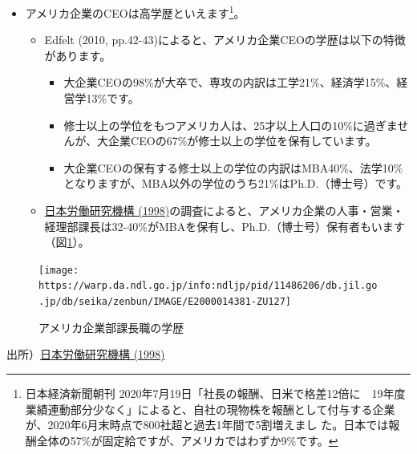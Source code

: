 \documentclass[
]{book}
\begin{document}
\begin{itemize}
\item
  アメリカ企業のCEOは高学歴といえます\footnote{日本経済新聞朝刊 2020年7月19日「社長の報酬、日米で格差12倍に　19年度　業績連動部分少なく」によると、自社の現物株を報酬として付与する企業が、2020年6月末時点で800社超と過去1年間で5割増えまし
    た。日本では報酬全体の57\%が固定給ですが、アメリカではわずか9\%です。}。

  \begin{itemize}
  \item
    Edfelt (2010, pp.42-43)によると、アメリカ企業CEOの学歴は以下の特徴があります。

    \begin{itemize}
    \item
      大企業CEOの98\%が大卒で、専攻の内訳は工学21\%、経済学15\%、経営学13\%です。
    \item
      修士以上の学位をもつアメリカ人は、25才以上人口の10\%に過ぎませんが、大企業CEOの67\%が修士以上の学位を保有しています。
    \item
      大企業CEOの保有する修士以上の学位の内訳はMBA40\%、法学10\%となりますが、MBA以外の学位のうち21\%はPh.D.（博士号）です。
    \end{itemize}
  \item
    \href{https://warp.da.ndl.go.jp/info:ndljp/pid/11486206/db.jil.go.jp/db/seika/zenbun/E2000014381_ZEN.htm}{日本労働研究機構 (1998)}の調査によると、アメリカ企業の人事・営業・経理部課長は32-40\%がMBAを保有し、Ph.D.（博士号）保有者もいます（図\ref{fig:uscareer}）。
  \end{itemize}
\end{itemize}

\begin{figure}
\texttt{[image: https://warp.da.ndl.go.jp/info:ndljp/pid/11486206/db.jil.go.jp/db/seika/zenbun/IMAGE/E2000014381-ZU127]} \caption{アメリカ企業部課長職の学歴}\label{fig:uscareer}
\end{figure}

出所）\href{https://warp.da.ndl.go.jp/info:ndljp/pid/11486206/db.jil.go.jp/db/seika/zenbun/E2000014381_ZEN.htm}{日本労働研究機構 (1998)}
\end{document}
